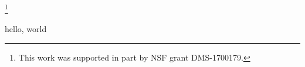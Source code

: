 \documentclass[epub]{gsm-l}
\begin{document}
\thanks{This work was supported in part by NSF grant DMS-1700179.}

\frontmatter

\setcounter{page}{5}
\thispagestyle{empty}

\cleardoublepage


\tableofcontents

\mainmatter

hello, world
\end{document}
